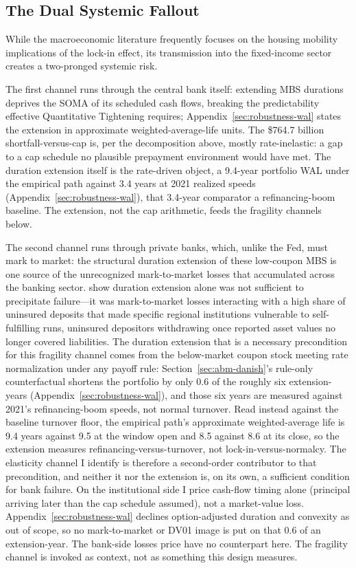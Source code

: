 \documentclass[12pt]{article}
\begin{document}
\subsection{The Dual Systemic Fallout}\label{sec:discussion-fallout}

While the macroeconomic literature frequently focuses on the housing mobility implications of the lock-in effect, its transmission into the fixed-income sector creates a two-pronged systemic risk.

The first channel runs through the central bank itself: extending MBS durations deprives the SOMA of its scheduled cash flows, breaking the predictability effective Quantitative Tightening requires; Appendix~\ref{sec:robustness-wal} states the extension in approximate weighted-average-life units. The \$764.7 billion shortfall-versus-cap is, per the decomposition above, mostly rate-inelastic: a gap to a cap schedule no plausible prepayment environment would have met. The duration extension itself is the rate-driven object, a 9.4-year portfolio WAL under the empirical path against 3.4 years at 2021 realized speeds (Appendix~\ref{sec:robustness-wal}), that 3.4-year comparator a refinancing-boom baseline. The extension, not the cap arithmetic, feeds the fragility channels below.

The second channel runs through private banks, which, unlike the Fed, must mark to market: the structural duration extension of these low-coupon MBS is one source of the unrecognized mark-to-market losses that accumulated across the banking sector. \citet{jiang2023} show duration extension alone was not sufficient to precipitate failure---it was mark-to-market losses interacting with a high share of uninsured deposits that made specific regional institutions vulnerable to self-fulfilling runs, uninsured depositors withdrawing once reported asset values no longer covered liabilities. The duration extension that is a necessary precondition for this fragility channel comes from the below-market coupon stock meeting rate normalization under any payoff rule: Section~\ref{sec:abm-danish}'s rule-only counterfactual shortens the portfolio by only 0.6 of the roughly six extension-years (Appendix~\ref{sec:robustness-wal}), and those six years are measured against 2021's refinancing-boom speeds, not normal turnover. Read instead against the baseline turnover floor, the empirical path's approximate weighted-average life is 9.4 years against 9.5 at the window open and 8.5 against 8.6 at its close, so the extension measures refinancing-versus-turnover, not lock-in-versus-normalcy. The elasticity channel I identify is therefore a second-order contributor to that precondition, and neither it nor the extension is, on its own, a sufficient condition for bank failure. On the institutional side I price cash-flow timing alone (principal arriving later than the cap schedule assumed), not a market-value loss. Appendix~\ref{sec:robustness-wal} declines option-adjusted duration and convexity as out of scope, so no mark-to-market or DV01 image is put on that 0.6 of an extension-year. The bank-side losses \citet{jiang2023} price have no counterpart here. The fragility channel is invoked as context, not as something this design measures.
\end{document}
